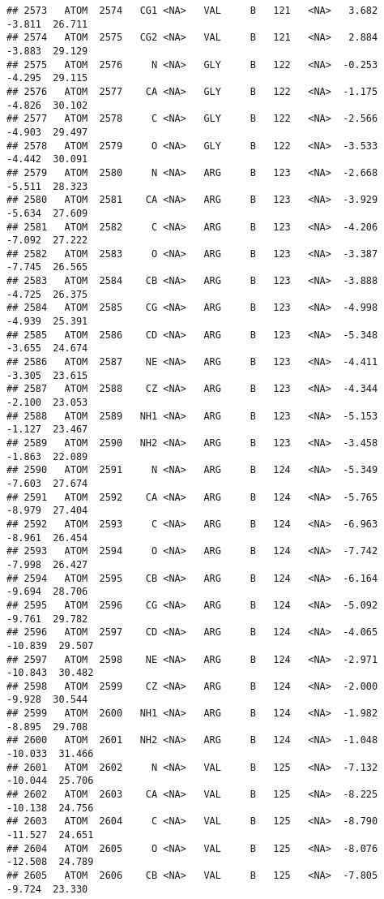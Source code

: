 \documentclass[
]{article}
\begin{document}
\begin{verbatim}
## 2573   ATOM  2574   CG1 <NA>   VAL     B   121   <NA>   3.682  -3.811  26.711
## 2574   ATOM  2575   CG2 <NA>   VAL     B   121   <NA>   2.884  -3.883  29.129
## 2575   ATOM  2576     N <NA>   GLY     B   122   <NA>  -0.253  -4.295  29.115
## 2576   ATOM  2577    CA <NA>   GLY     B   122   <NA>  -1.175  -4.826  30.102
## 2577   ATOM  2578     C <NA>   GLY     B   122   <NA>  -2.566  -4.903  29.497
## 2578   ATOM  2579     O <NA>   GLY     B   122   <NA>  -3.533  -4.442  30.091
## 2579   ATOM  2580     N <NA>   ARG     B   123   <NA>  -2.668  -5.511  28.323
## 2580   ATOM  2581    CA <NA>   ARG     B   123   <NA>  -3.929  -5.634  27.609
## 2581   ATOM  2582     C <NA>   ARG     B   123   <NA>  -4.206  -7.092  27.222
## 2582   ATOM  2583     O <NA>   ARG     B   123   <NA>  -3.387  -7.745  26.565
## 2583   ATOM  2584    CB <NA>   ARG     B   123   <NA>  -3.888  -4.725  26.375
## 2584   ATOM  2585    CG <NA>   ARG     B   123   <NA>  -4.998  -4.939  25.391
## 2585   ATOM  2586    CD <NA>   ARG     B   123   <NA>  -5.348  -3.655  24.674
## 2586   ATOM  2587    NE <NA>   ARG     B   123   <NA>  -4.411  -3.305  23.615
## 2587   ATOM  2588    CZ <NA>   ARG     B   123   <NA>  -4.344  -2.100  23.053
## 2588   ATOM  2589   NH1 <NA>   ARG     B   123   <NA>  -5.153  -1.127  23.467
## 2589   ATOM  2590   NH2 <NA>   ARG     B   123   <NA>  -3.458  -1.863  22.089
## 2590   ATOM  2591     N <NA>   ARG     B   124   <NA>  -5.349  -7.603  27.674
## 2591   ATOM  2592    CA <NA>   ARG     B   124   <NA>  -5.765  -8.979  27.404
## 2592   ATOM  2593     C <NA>   ARG     B   124   <NA>  -6.963  -8.961  26.454
## 2593   ATOM  2594     O <NA>   ARG     B   124   <NA>  -7.742  -7.998  26.427
## 2594   ATOM  2595    CB <NA>   ARG     B   124   <NA>  -6.164  -9.694  28.706
## 2595   ATOM  2596    CG <NA>   ARG     B   124   <NA>  -5.092  -9.761  29.782
## 2596   ATOM  2597    CD <NA>   ARG     B   124   <NA>  -4.065 -10.839  29.507
## 2597   ATOM  2598    NE <NA>   ARG     B   124   <NA>  -2.971 -10.843  30.482
## 2598   ATOM  2599    CZ <NA>   ARG     B   124   <NA>  -2.000  -9.928  30.544
## 2599   ATOM  2600   NH1 <NA>   ARG     B   124   <NA>  -1.982  -8.895  29.708
## 2600   ATOM  2601   NH2 <NA>   ARG     B   124   <NA>  -1.048 -10.033  31.466
## 2601   ATOM  2602     N <NA>   VAL     B   125   <NA>  -7.132 -10.044  25.706
## 2602   ATOM  2603    CA <NA>   VAL     B   125   <NA>  -8.225 -10.138  24.756
## 2603   ATOM  2604     C <NA>   VAL     B   125   <NA>  -8.790 -11.527  24.651
## 2604   ATOM  2605     O <NA>   VAL     B   125   <NA>  -8.076 -12.508  24.789
## 2605   ATOM  2606    CB <NA>   VAL     B   125   <NA>  -7.805  -9.724  23.330

\end{verbatim}
\end{document}

